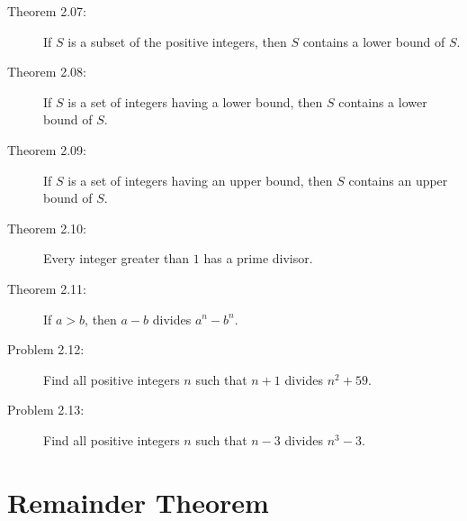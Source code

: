 \documentclass{article}
\begin{document}
\begin{description}
  \item[Theorem 2.07:] If $S$ is a subset of the positive integers, then $S$ contains a lower bound of $S$.

  \item[Theorem 2.08:] If $S$ is a set of integers having a lower bound, then $S$ contains a lower bound of $S$.

  \item[Theorem 2.09:] If $S$ is a set of integers having an upper bound, then $S$ contains an upper bound of $S$.

  \item[Theorem 2.10:] Every integer greater than $1$ has a prime divisor.

  \item[Theorem 2.11:] If $a>b$, then $a-b$ divides $a^n-b^n$.

  \item[Problem 2.12:] Find all positive integers $n$ such that $n+1$ divides $n^2+59$.

  \item[Problem 2.13:] Find all positive integers $n$ such that $n-3$ divides $n^3-3$.

\end{description}


\section{Remainder Theorem}
\end{document}
